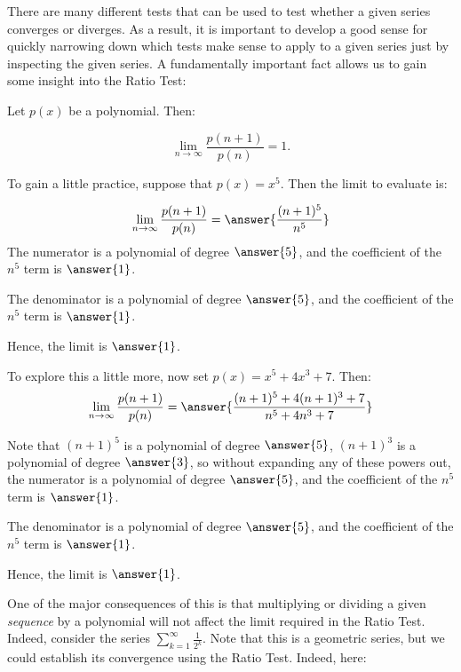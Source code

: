 \documentclass{ximera}
\author{Jim Talamo}
\begin{document}
\begin{exercise}
There are many different tests that can be used to test whether a given series converges or diverges.  As a result, it is important to develop a good sense for quickly narrowing down which tests make sense to apply to a given series just by inspecting the given series.  A fundamentally important fact allows us to gain some insight into the Ratio Test:

\begin{fact}
Let $p(x)$ be a polynomial.  Then:

\[
\lim_{n \to \infty} \frac{p(n+1)}{p(n)} = 1.
\]
\end{fact}

\begin{exercise}
To gain a little practice, suppose that $p(x) = x^5$.  Then the limit to evaluate is:

\[
\lim_{n \to \infty} \frac{p(n+1)}{p(n)} = \answer{\frac{(n+1)^5}{n^5}}
\]
The numerator is a polynomial of degree $\answer{5}$, and the coefficient of the $n^5$ term is $\answer{1}$.

The denominator is a polynomial of degree $\answer{5}$, and the coefficient of the $n^5$ term is $\answer{1}$.

Hence, the limit is $\answer{1}$.

\begin{exercise}
To explore this a little more, now set $p(x) = x^5+4x^3+7$.  Then:
\[
\lim_{n \to \infty} \frac{p(n+1)}{p(n)} = \answer{\frac{(n+1)^5+4(n+1)^3+7}{n^5+4n^3+7}}
\]

Note that $(n+1)^5$ is a polynomial of degree $\answer{5}$, $(n+1)^3$ is a polynomial of degree $\answer{3}$, so without expanding any of these powers out, the numerator is a polynomial of degree $\answer{5}$, and the coefficient of the $n^5$ term is $\answer{1}$.

The denominator is a polynomial of degree $\answer{5}$, and the coefficient of the $n^5$ term is $\answer{1}$.

Hence, the limit is $\answer{1}$.

\end{exercise}


\begin{exercise}
One of the major consequences of this is that multiplying or dividing a given \emph{sequence} by a polynomial will not affect the limit required in the Ratio Test.  Indeed, consider the series $\sum_{k=1}^{\infty} \frac{1}{2^k}$.  Note that this is a geometric series, but we could establish its convergence using the Ratio Test.  Indeed, here:


\end{exercise}
\end{exercise}
\end{exercise}
\end{document}
